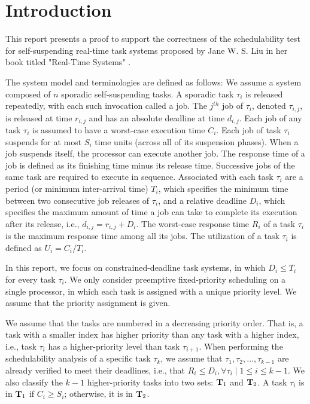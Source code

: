 \section{Introduction}

This report presents a proof to support the correctness of the
schedulability test for self-suspending real-time task systems proposed by Jane
W. S. Liu in her book titled "Real-Time Systems" \cite{Liu:2000:RS:518501}.

The system model and terminologies are defined as follows: We assume a system composed of $n$ sporadic self-suspending tasks. A sporadic task $\tau_i$ is released repeatedly, with each such invocation called a
job. The $j^{th}$ job of $\tau_i$, denoted $\tau_{i,j}$, is released
at time $r_{i,j}$ and has an absolute deadline at time $d_{i,j}$. Each
job of any task $\tau_i$ is assumed to have a worst-case execution time $C_i$. Each job of task $\tau_i$ 
suspends for at most $S_i$ time units (across all of its suspension phases). When a job suspends itself, 
the processor can execute another job. 
The response time
of a job is defined as its finishing time minus its release
time. Successive jobs of the same task are required to execute in
sequence. Associated with each task $\tau_i$ are a period (or minimum inter-arrival time) $T_i$, which
specifies the minimum time between two consecutive job releases of
$\tau_i$, and a relative deadline $D_i$, which specifies the maximum amount of time a job can take to complete its execution after its release, i.e., $d_{i,j}=r_{i,j}+D_i$. The worst-case response
time $R_i$ of a task $\tau_i$ is the maximum response time among all its
jobs.  The utilization of a task $\tau_i$ is defined as $U_i=C_i/T_i$.

In this report, we focus on constrained-deadline task systems, in which $D_i \leq T_i$ for every task $\tau_i$. We only consider preemptive fixed-priority scheduling on a single processor, in which each task is assigned with a unique priority level. We assume that the priority assignment is given.

We assume that the tasks are numbered in a decreasing priority order. That is, a task with a smaller index has higher priority than any task with a higher index, i.e., task $\tau_i$ has a higher-priority level than task $\tau_{i+1}$. When performing the schedulability analysis of a specific task $\tau_k$, we assume that $\tau_1, \tau_2, \ldots, \tau_{k-1}$ are already verified to meet their deadlines, i.e., that $R_i \leq D_i, \forall \tau_i \mid 1 \leq i \leq k-1$. We also classify the $k-1$ higher-priority tasks into two sets: ${\bf T}_1$ and ${\bf T}_2$. A task $\tau_i$ is in ${\bf T}_1$ if $C_i \geq S_i$; otherwise, it is in ${\bf T}_2$. 

